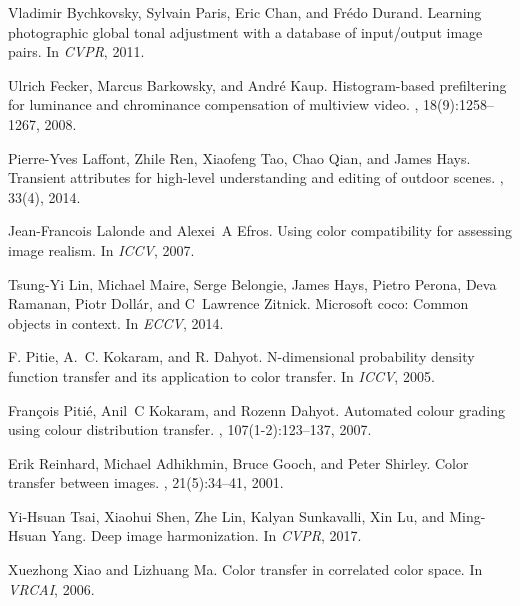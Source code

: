 \documentclass[10pt,twocolumn,letterpaper]{article}
\begin{document}
\small
\begin{thebibliography}{10}\itemsep=-1pt

Vladimir Bychkovsky, Sylvain Paris, Eric Chan, and Fr{\'e}do Durand.
\newblock Learning photographic global tonal adjustment with a database of
  input/output image pairs.
\newblock In {\em CVPR}, 2011.

Ulrich Fecker, Marcus Barkowsky, and Andr{\'e} Kaup.
\newblock Histogram-based prefiltering for luminance and chrominance
  compensation of multiview video.
,
  18(9):1258--1267, 2008.

Pierre-Yves Laffont, Zhile Ren, Xiaofeng Tao, Chao Qian, and James Hays.
\newblock Transient attributes for high-level understanding and editing of
  outdoor scenes.
, 33(4), 2014.

Jean-Francois Lalonde and Alexei~A Efros.
\newblock Using color compatibility for assessing image realism.
\newblock In {\em ICCV}, 2007.

Tsung-Yi Lin, Michael Maire, Serge Belongie, James Hays, Pietro Perona, Deva
  Ramanan, Piotr Doll{\'a}r, and C~Lawrence Zitnick.
\newblock Microsoft coco: Common objects in context.
\newblock In {\em ECCV}, 2014.

F. {Pitie}, A.~C. {Kokaram}, and R. {Dahyot}.
\newblock N-dimensional probability density function transfer and its
  application to color transfer.
\newblock In {\em ICCV}, 2005.

Fran{\c{c}}ois Piti{\'e}, Anil~C Kokaram, and Rozenn Dahyot.
\newblock Automated colour grading using colour distribution transfer.
, 107(1-2):123--137,
  2007.

Erik Reinhard, Michael Adhikhmin, Bruce Gooch, and Peter Shirley.
\newblock Color transfer between images.
, 21(5):34--41, 2001.

Yi-Hsuan Tsai, Xiaohui Shen, Zhe Lin, Kalyan Sunkavalli, Xin Lu, and Ming-Hsuan
  Yang.
\newblock Deep image harmonization.
\newblock In {\em CVPR}, 2017.

Xuezhong Xiao and Lizhuang Ma.
\newblock Color transfer in correlated color space.
\newblock In {\em VRCAI}, 2006.


\end{thebibliography}
\end{document}
